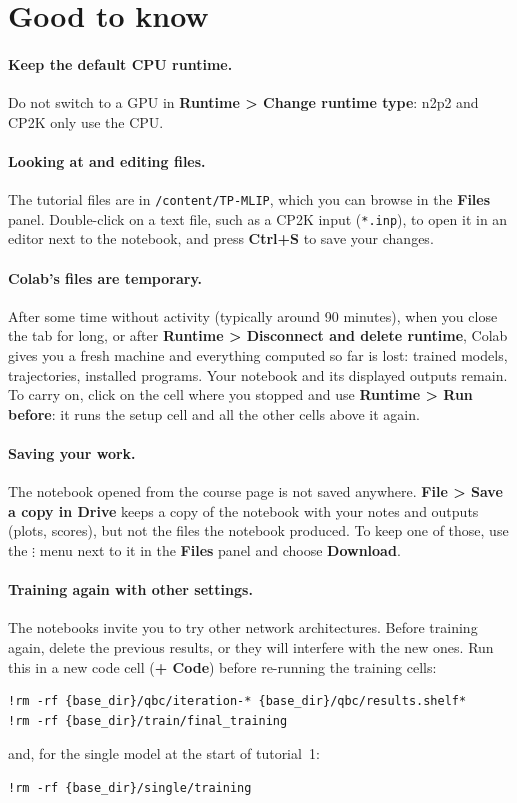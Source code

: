 \documentclass[11pt,a4paper]{article}
\newcommand{\menu}[1]{\textsf{\textbf{#1}}}
\begin{document}
\section{Good to know}

\paragraph{Keep the default CPU runtime.} Do not switch to a GPU in
\menu{Runtime > Change runtime type}: n2p2 and CP2K only use the CPU.

\paragraph{Looking at and editing files.} The tutorial files are in
\texttt{/content/TP-MLIP}, which you can browse in the \menu{Files} panel.
Double-click on a text file, such as a CP2K input (\texttt{*.inp}), to open it
in an editor next to the notebook, and press \menu{Ctrl+S} to save your
changes.

\paragraph{Colab's files are temporary.} After some time without activity
(typically around 90 minutes), when you close the tab for long, or after
\menu{Runtime > Disconnect and delete runtime}, Colab gives you a fresh
machine and everything computed so far is lost: trained models, trajectories,
installed programs. Your notebook and its displayed outputs remain. To carry on,
click on the cell where you stopped and use \menu{Runtime > Run before}: it
runs the setup cell and all the other cells above it again.

\paragraph{Saving your work.} The notebook opened from the course page is
not saved anywhere. \menu{File > Save a copy in Drive} keeps a copy of the
notebook with your notes and outputs (plots, scores), but not the files the
notebook produced. To keep one of those, use the \menu{$\vdots$} menu next to it
in the \menu{Files} panel and choose \menu{Download}.

\paragraph{Training again with other settings.} The notebooks invite you to
try other network architectures. Before training again, delete the previous
results, or they will interfere with the new ones. Run this in a new code cell
(\menu{+ Code}) before re-running the training cells:
\begin{lstlisting}
!rm -rf {base_dir}/qbc/iteration-* {base_dir}/qbc/results.shelf*
!rm -rf {base_dir}/train/final_training
\end{lstlisting}
and, for the single model at the start of tutorial~1:
\begin{lstlisting}
!rm -rf {base_dir}/single/training
\end{lstlisting}
\end{document}
